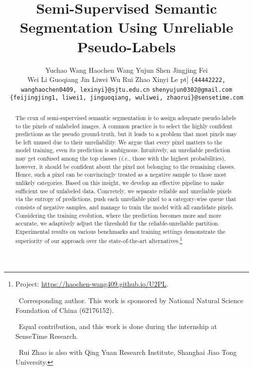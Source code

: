 \documentclass[10pt, twocolumn, letterpaper]{article}
\begin{document}
\title{Semi-Supervised Semantic Segmentation Using Unreliable Pseudo-Labels}


\author{
    Yuchao Wang \quad
    Haochen Wang \quad
    Yujun Shen \quad
    Jingjing Fei \quad \\
    Wei Li \quad
    Guoqiang Jin \quad
    Liwei Wu \quad
    Rui Zhao \quad
    Xinyi Le \5pt]
    \small{\texttt{\{44442222, wanghaochen0409, lexinyi\}@sjtu.edu.cn}} \qquad
    \small{\texttt{shenyujun0302@gmail.com}} \\
    \small{\texttt{\{feijingjing1, liwei1, jinguoqiang, wuliwei, zhaorui\}@sensetime.com}}
}


\maketitle














\begin{abstract}
The crux of semi-supervised semantic segmentation is to assign adequate pseudo-labels to the pixels of unlabeled images.
A common practice is to select the highly confident predictions as the pseudo ground-truth, but it leads to a problem that most pixels may be left unused due to their unreliability.
We argue that every pixel matters to the model training, even its prediction is ambiguous.
Intuitively, an unreliable prediction may get confused among the top classes (\textit{i.e.}, those with the highest probabilities), however, it should be confident about the pixel not belonging to the remaining classes.
Hence, such a pixel can be convincingly treated as a negative sample to those most unlikely categories.
Based on this insight, we develop an effective pipeline to make sufficient use of unlabeled data.
Concretely, we separate reliable and unreliable pixels via the entropy of predictions, push each unreliable pixel to a category-wise queue that consists of negative samples, and manage to train the model with all candidate pixels.
Considering the training evolution, where the prediction becomes more and more accurate, we adaptively adjust the threshold for the reliable-unreliable partition.
Experimental results on various benchmarks and training settings demonstrate the superiority of our approach over the state-of-the-art alternatives.\footnote{
Project: \url{https://haochen-wang409.github.io/U2PL}.

~Corresponding author. This work is sponsored by National Natural Science Foundation of China (62176152).

~Equal contribution, and this work is done during the internship at SenseTime Research.

~Rui Zhao is also with Qing Yuan Research Institute, Shanghai Jiao Tong University.
}


\end{abstract}
\end{document}
